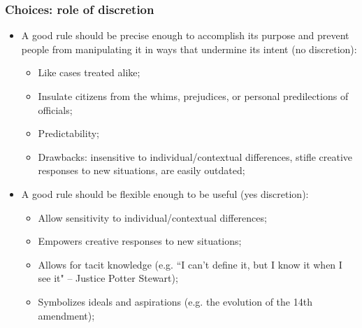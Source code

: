 \documentclass[aspectratio=169]{beamer}
\theoremstyle{principle}
\begin{document}
\begin{frame}
\frametitle{Choices: role of discretion}

\begin{itemize}
\item A good rule should be precise enough to accomplish its purpose and prevent people from manipulating it in ways that undermine its intent (no discretion):
\begin{itemize}
\item Like cases treated alike;
\item Insulate citizens from the whims, prejudices, or personal predilections of officials;
\item Predictability;
\item Drawbacks: insensitive to individual/contextual differences, stifle creative responses to new situations, are easily outdated;
\end{itemize}
\bigskip
\item A good rule should be flexible enough to be useful (yes discretion):
\begin{itemize}
\item Allow sensitivity to individual/contextual differences;
\item Empowers creative responses to new situations;
\item Allows for tacit knowledge (e.g. ``I can’t define it, but I know it when I see it" -- Justice Potter Stewart);
\item Symbolizes ideals and aspirations (e.g. the evolution of the 14th amendment);
\end{itemize}
\end{itemize}

\end{frame}
\end{document}
